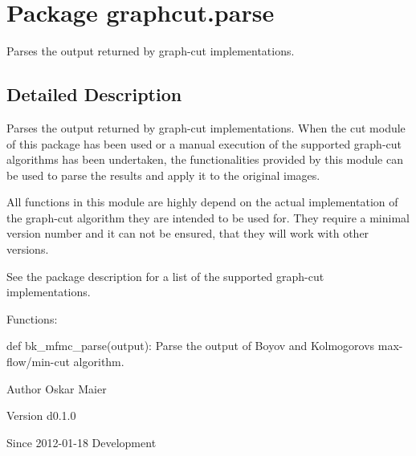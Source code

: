 \hypertarget{namespacegraphcut_1_1parse}{
\section{Package graphcut.parse}
\label{namespacegraphcut_1_1parse}
}


Parses the output returned by graph-\/cut implementations.  




\subsection{Detailed Description}
Parses the output returned by graph-\/cut implementations. When the cut module of this package has been used or a manual execution of the supported graph-\/cut algorithms has been undertaken, the functionalities provided by this module can be used to parse the results and apply it to the original images.

All functions in this module are highly depend on the actual implementation of the graph-\/cut algorithm they are intended to be used for. They require a minimal version number and it can not be ensured, that they will work with other versions.

See the package description for a list of the supported graph-\/cut implementations.

Functions:
\begin{DoxyItemize}
\item def bk\_\-mfmc\_\-parse(output): Parse the output of Boyov and Kolmogorovs max-\/flow/min-\/cut algorithm.
\end{DoxyItemize}

\begin{DoxyAuthor}{Author}
Oskar Maier 
\end{DoxyAuthor}
\begin{DoxyVersion}{Version}
d0.1.0 
\end{DoxyVersion}
\begin{DoxySince}{Since}
2012-\/01-\/18  Development 
\end{DoxySince}
